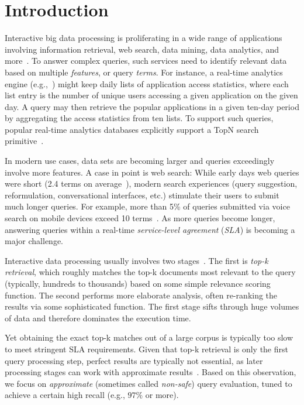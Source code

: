 \section{Introduction}
\label{sec:intro}

Interactive big data processing is proliferating in a wide range of applications involving
information retrieval, web search, data mining, data analytics, and more~\cite{top-k-survey}. 
To answer complex queries, such services need to identify relevant data based on multiple \emph{features}, or query \emph{terms}.  
For instance, a real-time analytics engine (e.g.,~\cite{flurry}) might keep daily lists of application access statistics, where each list entry
is the number of unique users accessing a given application on the given day.  
A query may then retrieve the popular applications in a given ten-day period by aggregating the access statistics from ten lists.
To support such queries,
popular real-time analytics databases explicitly support a  TopN search primitive~\cite{druid-topN}.

In modern use cases,  data sets are becoming larger and queries exceedingly  involve more features. 
A case in point is web search:  
While  early days web queries were short (2.4 terms on average~\cite{Spink:2001:SWP:362968.362979}), 
modern search experiences (query suggestion, reformulation, conversational interfaces, etc.) stimulate their users to submit much longer queries. 
For example, more than 5\% of queries submitted via voice search on mobile devices exceed 10 terms~\cite{sigir/Guy16}. 
As more queries become longer, answering queries within a real-time \emph{service-level agreement} ({\em SLA}) 
is becoming a major challenge.  

Interactive data processing   usually involves two stages~\cite{Wang:2011}. 
The first  is \emph{top-k retrieval}, which roughly matches the top-k documents most relevant to the query 
(typically, hundreds to thousands) based on some simple relevance scoring function. 
The second  performs more elaborate analysis, 
often re-ranking the  results via some sophisticated function. 
The first stage  sifts through huge volumes of data and therefore dominates the execution time. 

Yet obtaining the exact top-k matches out of a large corpus is typically too slow to meet stringent SLA requirements. 
Given that  top-k retrieval is only the first query  processing step, perfect results are typically not essential, as later  processing 
stages can work with approximate results~\cite{Crane:2017,Lin:2015,Wang:2011,druid-topN}. 
Based on this observation, we focus on \emph{approximate} 
(sometimes called \emph{non-safe}) query evaluation, tuned to achieve a certain high recall (e.g., $97\%$ or more). 

